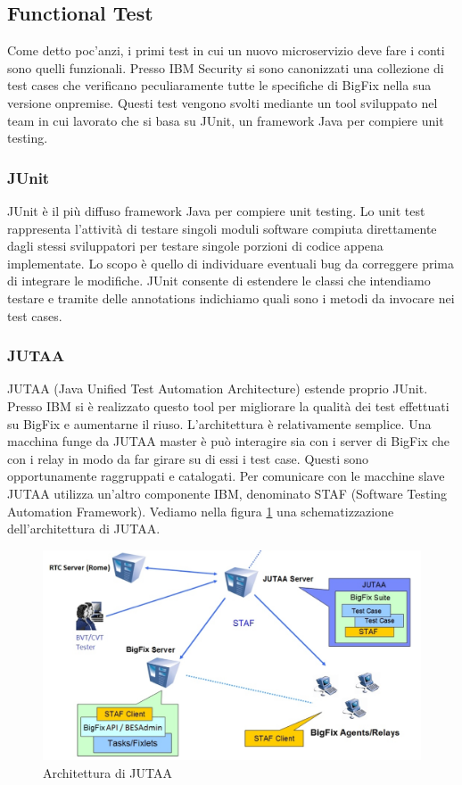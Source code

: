 \subsection{Functional Test}
Come detto poc'anzi, i primi test in cui un nuovo microservizio deve fare i conti sono quelli funzionali. Presso IBM Security si sono canonizzati una collezione di test cases che verificano peculiaramente tutte le specifiche di BigFix nella sua versione onpremise. Questi test vengono svolti mediante un tool sviluppato nel team in cui lavorato che si basa su JUnit, un framework Java per compiere unit testing.
\subsubsection{JUnit}
JUnit è il più diffuso framework Java per compiere unit testing. Lo unit test rappresenta l'attività di testare singoli moduli software compiuta direttamente dagli stessi sviluppatori per testare singole porzioni di codice appena implementate. Lo scopo è quello di individuare eventuali bug da correggere prima di integrare le modifiche. JUnit consente di estendere le classi che intendiamo testare e tramite delle annotations indichiamo quali sono i metodi da invocare nei test cases.
\subsubsection{JUTAA}
JUTAA (Java Unified Test Automation Architecture) estende proprio JUnit. Presso IBM si è realizzato questo tool per migliorare la qualità dei test effettuati su BigFix e aumentarne il riuso. L'architettura è relativamente semplice. Una macchina funge da JUTAA master è può interagire sia con i server di BigFix che con i relay in modo da far girare su di essi i test case. Questi sono opportunamente raggruppati e catalogati. Per comunicare con le macchine slave JUTAA utilizza un'altro componente IBM, denominato STAF (Software Testing Automation Framework). Vediamo nella figura \ref{fig:jutaaarchitecture} una schematizzazione dell'architettura di JUTAA.
\begin{figure}[h]
	\centering
	\includegraphics[width=0.7\linewidth]{capitoli/imgs/jutaaarchitecture}
	\caption{Architettura di JUTAA}
	\label{fig:jutaaarchitecture}
\end{figure}
